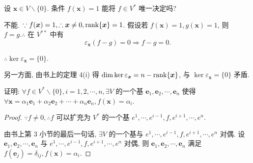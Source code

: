 \documentclass[color=black,device=normal,lang=cn,mode=geye]{elegantnote}
\begin{document}
\begin{exercise}%
    设 $\boldsymbol{x}\in V\backslash\{0\}$. 条件 $f(\boldsymbol{x})=1$ 能将 $f\in V^*$ 唯一决定吗?
\end{exercise}
\begin{solution}
    不能. $\because f(\boldsymbol{x})=1,\therefore\boldsymbol{x}\neq0,\operatorname{rank} \{\boldsymbol{x}\}=1$. 假设若 $f(\boldsymbol{x})=1,g(\boldsymbol{x})=1$, 则 $f=g.\therefore$ 在 $V^{**}$ 中有
    \[\varepsilon_{\boldsymbol{x}}(f-g)=0\Rightarrow f-g=0.\]

    $\therefore\ker\varepsilon_{\boldsymbol{x}}=\{0\}$.
    
    另一方面, 由书上的定理 4(i) 得 $\dim\ker\varepsilon_{\boldsymbol{x}}=n-\operatorname{rank} \{\boldsymbol{x}\}$, 与 $\ker\varepsilon_{\boldsymbol{x}}=\{0\}$ 矛盾.
\end{solution}
\begin{exercise}%
    证明: $\forall f\in V^*\backslash\{0\},i=1,2,\cdots,n,\exists V$ 的一个基 $\boldsymbol{e}_1,\boldsymbol{e}_2,\cdots,\boldsymbol{e}_n$ 使得 $\forall\boldsymbol{x}=\alpha_1\boldsymbol{e}_1+\alpha_2\boldsymbol{e}_2+\cdots+\alpha_n\boldsymbol{e}_n,f(\boldsymbol{x})=\alpha_i$.
\end{exercise}
\begin{proof}
    $\because f\neq 0,\therefore f$ 可以扩充为 $V^*$ 的一个基 $e^1,\cdots,e^{i-1},f,e^{i+1},\cdots,e^n$.
    
    由书上第 3 小节的最后一句话, $\exists V$ 的一个基与 $e^1,\cdots,e^{i-1},f,e^{i+1},\cdots,e^n$ 对偶. 设 $\boldsymbol{e}_1,\boldsymbol{e}_2,\cdots,\boldsymbol{e}_n$ 与 $e^1,\cdots,e^{i-1},f,e^{i+1},\cdots,e^n$ 对偶, 则 $\boldsymbol{e}_1,\boldsymbol{e}_2,\cdots,\boldsymbol{e}_n$ 满足 $f(\boldsymbol{e}_j)=\delta_{ij},f(\boldsymbol{x})=\alpha_i$.
\end{proof}
\end{document}
